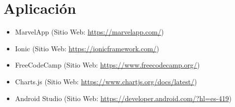         \section{Aplicación}
        
            \begin{itemize} [label=•]
                \setlength{\itemindent}{3em}
                \item MarvelApp (Sitio Web: \href{https://marvelapp.com/}{https://marvelapp.com/})
                \item Ionic (Sitio Web: \href{https://ionicframework.com/}{https://ionicframework.com/})
                \item FreeCodeCamp (Sitio Web: \href{https://www.freecodecamp.org/}{https://www.freecodecamp.org/})
                \item Charts.js (Sitio Web: \href{https://www.chartjs.org/docs/latest/}{https://www.chartjs.org/docs/latest/})
                \item Android Studio (Sitio Web: \href{https://developer.android.com/?hl=es-419}{https://developer.android.com/?hl=es-419})
            \end{itemize}
            
